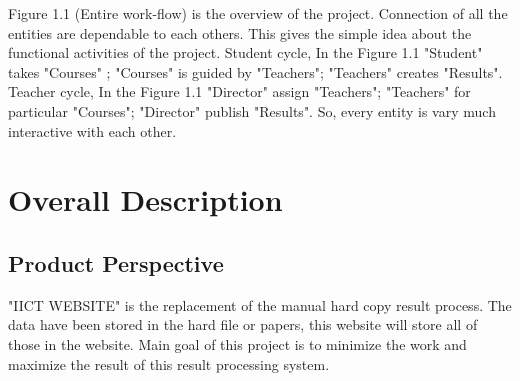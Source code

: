 \documentclass{scrreprt}
\begin{document}
\newline
Figure 1.1 (Entire work-flow) is the overview of the project. Connection of all the entities are dependable to each others.  This gives the simple idea about the functional activities of the project. 
\newline
Student cycle, In the Figure 1.1 "Student" takes "Courses" ; "Courses" is guided by "Teachers"; "Teachers" creates "Results". 
\newline
Teacher cycle, In the Figure 1.1 "Director" assign "Teachers"; "Teachers" for particular "Courses"; "Director" publish "Results".
\newline
So, every entity is vary much interactive with each other.


\chapter{Overall Description}

\section{Product Perspective}
"IICT WEBSITE" is the replacement of the manual hard copy result process. The data have been stored in the hard file or papers, this website will store all of those in the website. Main goal of this project is to minimize the work and maximize the result of this result processing system.
\end{document}
